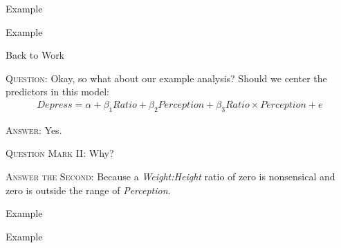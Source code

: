 \documentclass{beamer}
\newcommand{\va}[0]{\vspace{12pt}}
\begin{document}
\begin{frame}[shrink = 10]{Example}
  


\end{frame}


\begin{frame}[allowframebreaks]{Example}
  


\pagebreak



\pagebreak



\pagebreak



\pagebreak



\end{frame}



\begin{frame}{Back to Work}
  
  \textsc{Question:} Okay, so what about our example analysis? Should
  we center the predictors in this model:
  \begin{align*}
    Depress = \alpha + \beta_1Ratio + \beta_2Perception + \beta_3 Ratio \times Perception + e
  \end{align*}

  \pause
  
  \textsc{Answer:} Yes.\\\va
  
  \pause
  
  \textsc{Question Mark II:} Why?\\\va
  
  \pause 
  
  \textsc{Answer the Second:} Because a \emph{Weight:Height} ratio of zero
  is nonsensical and zero is outside the range of \emph{Perception}.
  
\end{frame}


\begin{frame}[shrink = 10]{Example}



\end{frame}


\begin{frame}[shrink = 10]{Example}
  


\end{frame}
\end{document}
